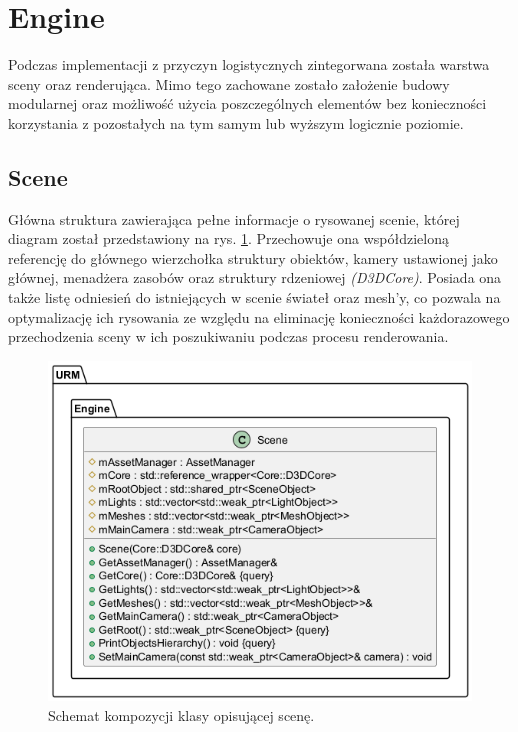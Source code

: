 	\vfill
	\clearpage
	
\section{Engine}
	Podczas implementacji z przyczyn logistycznych zintegorwana została warstwa sceny oraz renderująca. Mimo tego zachowane zostało założenie budowy modularnej oraz możliwość użycia poszczególnych elementów bez konieczności korzystania z pozostałych na tym samym lub wyższym logicznie poziomie.
	
\subsection{Scene}
	Główna struktura zawierająca pełne informacje o rysowanej scenie, której diagram został przedstawiony na rys. \ref{UML_Scene}. Przechowuje ona współdzieloną referencję do głównego wierzchołka struktury obiektów, kamery ustawionej jako głównej, menadżera zasobów oraz struktury rdzeniowej \textit{(D3DCore)}. Posiada ona także listę odniesień do istniejących w scenie świateł oraz mesh'y, co pozwala na optymalizację ich rysowania ze względu na eliminację konieczności każdorazowego przechodzenia sceny w ich poszukiwaniu podczas procesu renderowania.
	
	\begin{figure}[h!]
		\centering
		\includegraphics[width=\textwidth]{images/UML/scene.png}
		\caption{Schemat kompozycji klasy opisującej scenę.}
		\label{UML_Scene}
	\end{figure}
	
